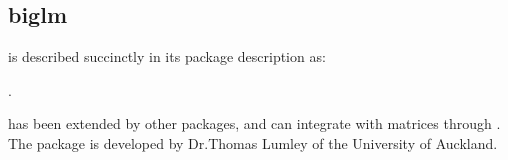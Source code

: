 \subsection{biglm}\label{subsec:biglm}

 is described succinctly in its package description as:

.

 has been extended by other packages, and can integrate with
 matrices through . The package is developed by
Dr.Thomas Lumley of the University of Auckland.
